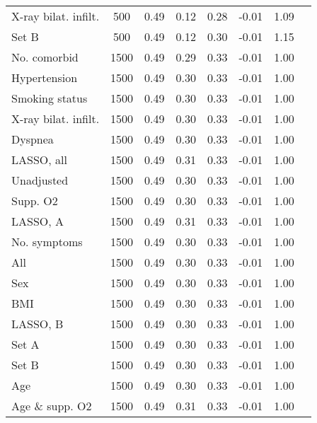 \documentclass{article}
\begin{document}
{\begin{longtable}{lccccccc}
X-ray bilat. infilt. & 500 & 0.49 & 0.12 & 0.28 & -0.01 & 1.09\\
Set B & 500 & 0.49 & 0.12 & 0.30 & -0.01 & 1.15\\ \midrule
No. comorbid & 1500 & 0.49 & 0.29 & 0.33 & -0.01 & 1.00\\
Hypertension & 1500 & 0.49 & 0.30 & 0.33 & -0.01 & 1.00\\
Smoking status & 1500 & 0.49 & 0.30 & 0.33 & -0.01 & 1.00\\
X-ray bilat. infilt. & 1500 & 0.49 & 0.30 & 0.33 & -0.01 & 1.00\\
Dyspnea & 1500 & 0.49 & 0.30 & 0.33 & -0.01 & 1.00\\
LASSO, all & 1500 & 0.49 & 0.31 & 0.33 & -0.01 & 1.00\\
Unadjusted & 1500 & 0.49 & 0.30 & 0.33 & -0.01 & 1.00\\
Supp. O2 & 1500 & 0.49 & 0.30 & 0.33 & -0.01 & 1.00\\
LASSO, A & 1500 & 0.49 & 0.31 & 0.33 & -0.01 & 1.00\\
No. symptoms & 1500 & 0.49 & 0.30 & 0.33 & -0.01 & 1.00\\
All & 1500 & 0.49 & 0.30 & 0.33 & -0.01 & 1.00\\
Sex & 1500 & 0.49 & 0.30 & 0.33 & -0.01 & 1.00\\
BMI & 1500 & 0.49 & 0.30 & 0.33 & -0.01 & 1.00\\
LASSO, B & 1500 & 0.49 & 0.30 & 0.33 & -0.01 & 1.00\\
Set A & 1500 & 0.49 & 0.30 & 0.33 & -0.01 & 1.00\\
Set B & 1500 & 0.49 & 0.30 & 0.33 & -0.01 & 1.00\\
Age & 1500 & 0.49 & 0.30 & 0.33 & -0.01 & 1.00\\
Age \& supp. O2 & 1500 & 0.49 & 0.31 & 0.33 & -0.01 & 1.00\\
\bottomrule
\hline
\end{longtable}
}

\clearpage
\end{document}
